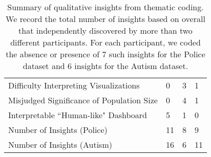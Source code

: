 \begin{table}[ht!]
\vspace{-10pt}
	\centering\scriptsize
	\begin{tabular}{l|l|l|l}
	& \system & \cluster & \BFS \\ \hline
	Difficulty Interpreting Visualizations & 0 & \cellcolor[HTML]{FD6864}3 & 1 \\ \hline
	Misjudged Significance of Population Size & 0 & \cellcolor[HTML]{FD6864}4 & 1 \\ \hline
	Interpretable ``Human-like" Dashboard & \cellcolor[HTML]{9AFF99}5 & 1 & 0 \\ \hline
	Number of Insights (Police) & \cellcolor[HTML]{9AFF99}11 & 8 & 9 \\ \hline
	Number of Insights (Autism) & \cellcolor[HTML]{9AFF99}16 & 6 & 11 \\
	\end{tabular}
\caption{Summary of qualitative insights from thematic coding. We record the total number of insights based on overall  that  independently discovered by more than two different participants. For each participant, we coded the absence or presence of 7 such insights for the Police dataset and 6 insights for the Autism dataset.}%
\label{table:thematic_summary}
\vspace{-20pt}
\end{table}
